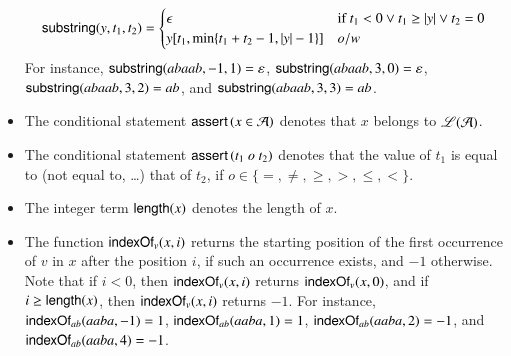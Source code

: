 \begin{itemize}
\[ \mathsf{substring}(y, t_1, t_2)=
\begin{cases}
\epsilon & \mbox{if }t_1<0\vee t_1 \ge |y| \vee t_2=0 \\
y[t_1, \min\{t_1+t_2-1, |y|-1\}] & o/w
\end{cases}
\]
For instance, $\mathsf{substring}(abaab, -1,1)=\varepsilon$, $\mathsf{substring}(abaab, 3,0)=\varepsilon$, $\mathsf{substring}(abaab, 3,2)=ab$, and $\mathsf{substring}(abaab, 3,3)=ab$.
%
\item The conditional statement $\textsf{assert}\left(x \in \mathcal{A}\right)$ denotes that $x$ belongs to $\mathscr{L}(\mathcal{A})$.
%
\item The conditional statement $\textsf{assert}\left(t_1 \ o\ t_2\right)$ denotes that the value of $t_1$ is equal to (not equal to, \dots) that of $t_2$, if $o\in \{ =, \neq, \geq, >, \leq, < \}$.
%
\item The integer term $\mathsf{length}(x)$ denotes the length of $x$. 
%
\item The function $\mathsf{indexOf}_v(x, i)$ returns the starting position of the first occurrence of $v$ in $x$ after the position $i$, if such an occurrence exists, and $-1$ otherwise. Note that if $i<0$, then $\mathsf{indexOf}_v(x, i)$ returns $\mathsf{indexOf}_v(x, 0)$, and if $i \ge \mathsf{length}(x)$, then $\mathsf{indexOf}_v(x, i)$ returns $-1$. For instance, $\mathsf{indexOf}_{ab}(aaba, -1) = 1$, $\mathsf{indexOf}_{ab}(aaba, 1) = 1$, $\mathsf{indexOf}_{ab}(aaba, 2)=-1$, and $\mathsf{indexOf}_{ab}(aaba, 4)=-1$.
\end{itemize}


